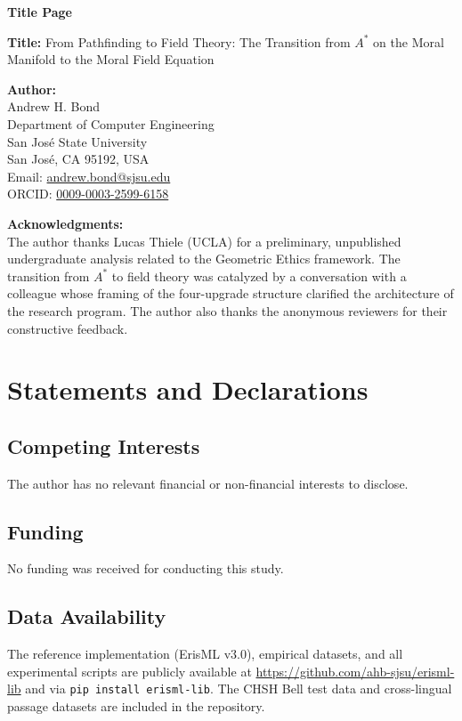 \documentclass[12pt]{article}
\begin{document}
\begin{center}
{\LARGE\bfseries Title Page}
\end{center}

\bigskip

\noindent\textbf{Title:} From Pathfinding to Field Theory: The Transition from $A^*$ on the Moral Manifold to the Moral Field Equation

\bigskip

\noindent\textbf{Author:}\\
Andrew H. Bond\\
Department of Computer Engineering\\
San Jos\'{e} State University\\
San Jos\'{e}, CA 95192, USA\\
Email: \href{mailto:andrew.bond@sjsu.edu}{andrew.bond@sjsu.edu}\\
ORCID: \href{https://orcid.org/0009-0003-2599-6158}{0009-0003-2599-6158}

\bigskip

\noindent\textbf{Acknowledgments:}\\
The author thanks Lucas Thiele (UCLA) for a preliminary, unpublished undergraduate analysis related to the Geometric Ethics framework. The transition from $A^*$ to field theory was catalyzed by a conversation with a colleague whose framing of the four-upgrade structure clarified the architecture of the research program. The author also thanks the anonymous reviewers for their constructive feedback.

\bigskip

\section*{Statements and Declarations}

\subsection*{Competing Interests}
The author has no relevant financial or non-financial interests to disclose.

\subsection*{Funding}
No funding was received for conducting this study.

\subsection*{Data Availability}
The reference implementation (ErisML v3.0), empirical datasets, and all experimental scripts are publicly available at \url{https://github.com/ahb-sjsu/erisml-lib} and via \texttt{pip install erisml-lib}. The CHSH Bell test data and cross-lingual passage datasets are included in the repository.
\end{document}
